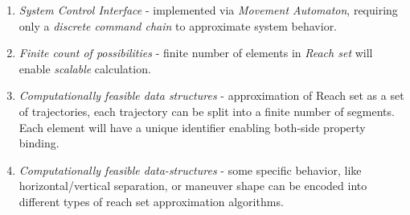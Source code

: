     \begin{enumerate}
        \item \emph{System Control Interface} - implemented via \emph{Movement Automaton}, requiring only a \emph{discrete command chain} to approximate system behavior.
        
        \item \emph{Finite count of possibilities} - finite number of elements in \emph{Reach set} will enable \emph{scalable} calculation.
        
        \item \emph{Computationally feasible data structures} - approximation of Reach set as a set of trajectories, each trajectory can be split into a finite number of segments. Each element will have a unique identifier enabling both-side  property binding.
        
        \item \emph{Computationally feasible data-structures} - some specific behavior, like horizontal/vertical separation, or maneuver shape can be encoded into  different types of reach set approximation algorithms.
    \end{enumerate}